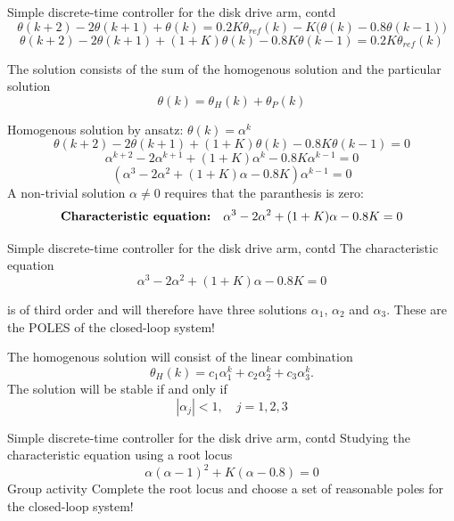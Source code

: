 \documentclass[presentation,aspectratio=1610]{beamer}
\begin{document}
\begin{frame}[label={sec:org3e8ba58}]{Simple discrete-time controller for the disk drive arm, contd}
\[ \theta(k+2) - 2\theta(k+1) + \theta(k) = 0.2K\theta_{ref}(k) - K\big(\theta(k) -0.8\theta(k-1)\big) \]
\[ \theta(k+2)-2\theta(k+1) + (1+K)\theta(k) - 0.8K\theta(k-1) = 0.2K\theta_{ref}(k)\]

The solution consists of the sum of the \alert{homogenous solution} and the \alert{particular solution}
\[ \theta(k) = \theta_H(k) + \theta_P(k) \]

\begin{block}{Homogenous solution by \alert{ansatz}: \(\theta(k) = \alpha^k\)}
\[ \theta(k+2)-2\theta(k+1) + (1+K)\theta(k) - 0.8K\theta(k-1) = 0\]
\[ \alpha^{k+2} - 2\alpha^{k+1} + (1+K)\alpha^k - 0.8K\alpha^{k-1} = 0\]
\[ (\alpha^3 - 2\alpha^2 + (1+K)\alpha - 0.8K) \alpha^{k-1} = 0\]
A non-trivial solution \(\alpha \neq 0\) requires that the paranthesis is zero:
\[ \text{\bf Characteristic equation:} \quad \alpha^3 - 2\alpha^2 + (1+K)\alpha - 0.8K = 0\]
\end{block}
\end{frame}


\begin{frame}[label={sec:orgd35bd0a}]{Simple discrete-time controller for the disk drive arm, contd}
The characteristic equation 
   \[ \alpha^3 - 2\alpha^2 + (1+K)\alpha - 0.8K = 0\]

is of \alert{third} order and will  therefore have \alert{three} solutions \(\alpha_1\),  \(\alpha_2\) and \(\alpha_3\). These are the \alert{POLES} of  the closed-loop system!

The homogenous solution will consist of the linear combination
\[ \theta_H(k) = c_1 \alpha_1^k + c_2\alpha_2^k + c_3\alpha_3^k.\]
The solution will be stable if and only if 
\[ |\alpha_j| < 1, \quad j=1,2,3\]
\end{frame}

\begin{frame}[label={sec:org95e5c27}]{Simple discrete-time controller for the disk drive arm, contd}
Studying the characteristic equation using a root locus 
\[ \alpha(\alpha -1)^2 + K(\alpha - 0.8) = 0\]
\alert{Group activity} Complete the root locus and choose a set of reasonable poles for the closed-loop system!

\begin{center}
\end{center}
\end{frame}
\end{document}
